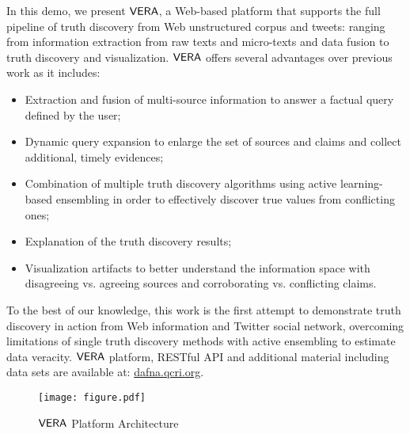 In this demo, we present $\mathsf{VERA}$, a Web-based platform that supports the full pipeline of truth discovery from Web unstructured corpus and tweets: ranging from information extraction from raw texts and micro-texts and data fusion to truth discovery and visualization. $\mathsf{VERA}$ offers several advantages over previous work as it includes: 
\renewcommand{\labelitemi}{$-$}
\begin{itemize}
\item Extraction and fusion of multi-source information to answer a factual query defined by the user;
\item Dynamic query expansion to enlarge the set of sources and claims and collect additional, timely evidences;
\item Combination of multiple truth discovery algorithms using active learning-based ensembling in order to effectively discover true values from conflicting ones;
\item Explanation of the truth discovery results;
\item Visualization artifacts to better understand the information space with disagreeing vs. agreeing sources and corroborating vs. conflicting claims.
\end{itemize}


 To the best of our knowledge, this work is the first attempt to demonstrate truth discovery in action from Web information and Twitter social network, overcoming limitations of single truth discovery methods with active ensembling to estimate data veracity. $\mathsf{VERA}$ platform, RESTful API and additional material including data sets are available at:  {\url{dafna.qcri.org}}.

 

\begin{figure}[t]
 \begin{center}
  \texttt{[image: figure.pdf]}
   \end{center}
\label{archi}\caption{$\mathsf{VERA}$ Platform Architecture }
\end{figure}
